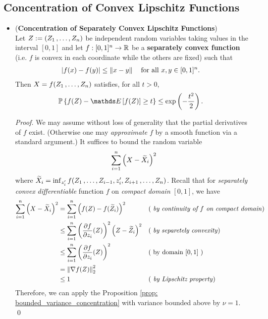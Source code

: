 \documentclass[11pt]{article}
\begin{document}
\subsection{Concentration of Convex Lipschitz Functions}
\begin{itemize}
\item \begin{theorem} (\textbf{Concentration of Separately Convex Lipschitz Functions}) \citep{boucheron2013concentration}\\
Let  $Z:= (Z_1 \,{,}\ldots{,}\, Z_{n})$ be independent random variables taking values in the interval $[0, 1]$ and let $f : [0, 1]^n \to {\mathbb R}$ be a \textbf{separately convex function} (i.e. $f$ is convex in each coordinate while the others are fixed) such that
\begin{align*}
\left\lvert f(x) - f(y) \right\rvert &\le \left\|x - y\right\|_{} \quad \text{for all }x, y \in [0, 1]^n.
\end{align*}
Then $X = f(Z_1 \,{,}\ldots{,}\, Z_{n})$ satisfies, for all $t > 0$,
\begin{align}
\bP\set{f(Z) - \E{}{f(Z)} \ge t } &\le \exp\paren{- \frac{t^2}{2}}. \label{ineqn: convex_lipschitz_concentration}
\end{align}
\end{theorem}
\begin{proof}
We may assume without loss of generality that the partial derivatives of $f$ exist. (Otherwise one may \emph{approximate} $f$ by a smooth function via a standard argument.) It suffices to bound the random variable 
\begin{align*}
\sum_{i=1}^{n}\left(X - \widetilde{X}_{i}\right)^2
\end{align*}
where $\widetilde{X}_{i} = \inf_{z_i'} f(Z_1 \,{,}\ldots{,}\, Z_{i-1}, z_{i}', Z_{i+1} \,{,}\ldots{,}\, Z_n)$. Recall that for \emph{separately convex} \emph{differentiable} function $f$ on \emph{compact domain} $[0,1]$, we have
\begin{align*}
\sum_{i=1}^{n}\left(X - \widetilde{X}_{i}\right)^2 &= \sum_{i=1}^{n}\left(f(Z) - f(\widetilde{Z}_{i})\right)^2  && \text{( \emph{by continuity of $f$ on compact domain})} \\
&\le \sum_{i=1}^{n}\left(\frac{\partial f}{ \partial z_i}(Z)\right)^2\left(Z - \widetilde{Z}_{i}\right)^2 && \text{( \emph{by separetely convexity})}\\
&\le \sum_{i=1}^{n}\left(\frac{\partial f}{ \partial z_i}(Z)\right)^2 && (\text{ by domain $[0,1]$ })\\
&= \left\|\nabla f(Z)\right\|_{2}^2 && \\
&\le 1 && (\text{\emph{ by Lipschitz property}})
\end{align*} Therefore, we can apply the Proposition \ref{prop: bounded_variance_concentration} with variance bounded above by $\nu = 1$. \qed
\end{proof}


\end{itemize}
\end{document}
